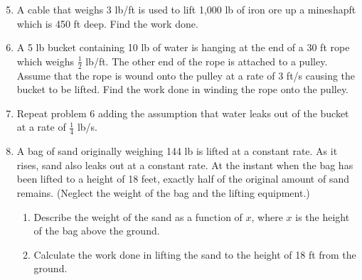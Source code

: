 \documentclass[12pt]{article}
\newif\ifans
\begin{document}
\begin{enumerate}
\setcounter{enumi}{4}
\item A cable that weighs 3 lb/ft is used to lift 1,000 lb of iron ore up a mineshapft which is 450 ft deep.  Find the work done.

\ifans{\fbox{753,750 ft$\cdot$lb}} \fi

\item A 5 lb bucket containing 10 lb of water is hanging at the end of a 30 ft rope which weighs $\frac{1}{2}$ lb/ft.  The other end of the rope is attached to a pulley.  Assume that the rope is wound onto the pulley at a rate of 3 ft/s causing the bucket to be lifted. Find the work done in winding the rope onto the pulley.

\ifans{\fbox{675 ft$\cdot$lb; Detailed Solution: \textcolor{blue}{\href{http://www.math.drexel.edu/classes/Calculus/resources/Math122HW/Solutions/122_10_Work_06_07.pdf}{Here}}}} \fi

\item Repeat problem 6 adding the assumption that water leaks out of the bucket at a rate of $\frac{1}{4}$ lb/s.

\ifans{\fbox{$\frac{1275}{2}$ ft$\cdot$lb; Detailed Solution: \textcolor{blue}{\href{http://www.math.drexel.edu/classes/Calculus/resources/Math122HW/Solutions/122_10_Work_06_07.pdf}{Here}}}} \fi

\item A bag of sand originally weighing 144 lb is lifted at a constant rate.  As it rises, sand also leaks out at a constant rate.  At the instant when the bag has been lifted to a height of 18 feet, exactly half of the original amount of sand remains.  (Neglect the weight of the bag and the lifting equipment.)

\begin{enumerate}

\item Describe the weight of the sand as a function of $x$, where $x$ is the height of the bag above the ground.

\ifans{\fbox{$w(x)=144-4x$}} \fi

\item Calculate the work done in lifting the sand to the height of 18 ft from the ground.

\ifans{\fbox{1944 ft$\cdot$lb}} \fi

\end{enumerate}

\end{enumerate}
\end{document}
